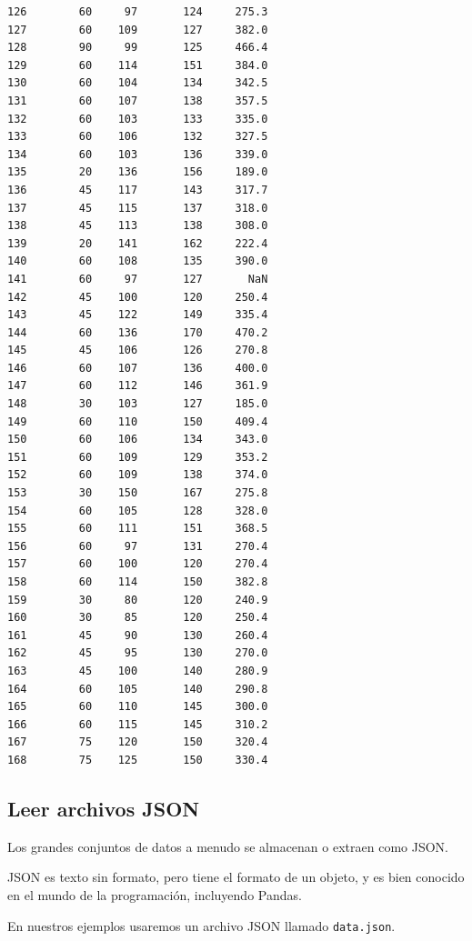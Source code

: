 \begin{code}
\begin{verbatim}
126        60     97       124     275.3
127        60    109       127     382.0
128        90     99       125     466.4
129        60    114       151     384.0
130        60    104       134     342.5
131        60    107       138     357.5
132        60    103       133     335.0
133        60    106       132     327.5
134        60    103       136     339.0
135        20    136       156     189.0
136        45    117       143     317.7
137        45    115       137     318.0
138        45    113       138     308.0
139        20    141       162     222.4
140        60    108       135     390.0
141        60     97       127       NaN
142        45    100       120     250.4
143        45    122       149     335.4
144        60    136       170     470.2
145        45    106       126     270.8
146        60    107       136     400.0
147        60    112       146     361.9
148        30    103       127     185.0
149        60    110       150     409.4
150        60    106       134     343.0
151        60    109       129     353.2
152        60    109       138     374.0
153        30    150       167     275.8
154        60    105       128     328.0
155        60    111       151     368.5
156        60     97       131     270.4
157        60    100       120     270.4
158        60    114       150     382.8
159        30     80       120     240.9
160        30     85       120     250.4
161        45     90       130     260.4
162        45     95       130     270.0
163        45    100       140     280.9
164        60    105       140     290.8
165        60    110       145     300.0
166        60    115       145     310.2
167        75    120       150     320.4
168        75    125       150     330.4
\end{verbatim}
\end{code}

\subsection{Leer archivos JSON}

Los grandes conjuntos de datos a menudo se almacenan o extraen como JSON.

JSON es texto sin formato, pero tiene el formato de un objeto, y es bien
conocido en el mundo de la programación, incluyendo Pandas.

En nuestros ejemplos usaremos un archivo JSON llamado
\texttt{\textquotesingle{}data.json\textquotesingle{}}.  \\

